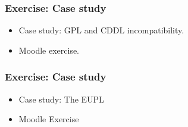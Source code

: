 
\begin{frame}
\frametitle{Exercise: Case study}


\begin{itemize}
\item Case study: GPL and CDDL incompatibility. 
\item Moodle exercise.
\end{itemize}

\end{frame}



\begin{frame}
\frametitle{Exercise: Case study}


\begin{itemize}
\item Case study: The EUPL
\item Moodle Exercise 
\end{itemize}

\end{frame}





